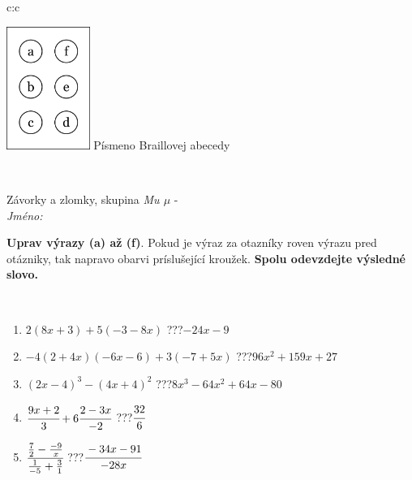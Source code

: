 \documentclass[10pt]{report}
\begin{document}
\begin{tabular}{c:c}
\begin{minipage}[c][104.5mm][t]{0.5\linewidth}
\begin{center}
\begin{minipage}{0.20\linewidth}
\begin{center}
\includegraphics[height=40mm]{../images/braille.png}
{\small Písmeno Braillovej abecedy}
\end{center}
\end{minipage}
\end{center}
\end{minipage}
\\ \hdashline
\begin{minipage}[c][104.5mm][t]{0.5\linewidth}
\begin{center}
\vspace{7mm}
{\huge Závorky a zlomky, skupina \textit{Mu $\mu$} -}\\[5mm]
\textit{Jméno:}\phantom{xxxxxxxxxxxxxxxxxxxxxxxxxxxxxxxxxxxxxxxxxxxxxxxxxxxxxxxxxxxxxxxxx}\\[5mm]
\begin{minipage}{0.95\linewidth}
\begin{center}
\textbf{Uprav výrazy (a) až (f)}. Pokud je výraz za otazníky roven výrazu pred otázniky, tak napravo obarvi príslušející kroužek. \textbf{Spolu odevzdejte výsledné slovo.}
\end{center}
\end{minipage}
\\[1mm]
\begin{minipage}{0.79\linewidth}
\begin{center}
\begin{varwidth}{\linewidth}
\begin{enumerate}
\normalsize
\item $2(8x+3)+5(-3-8x)$\quad \dotfill\; ???\;\dotfill \quad $-24x-9$
\item $-4(2+4x)(-6x-6)+3(-7+5x)$\quad \dotfill\; ???\;\dotfill \quad $96x^2+159x+27$
\item $(2x-4)^3-(4x+4)^2$\quad \dotfill\; ???\;\dotfill \quad $8x^3-64x^2+64x-80$
\item $\cfrac{9x+2}{3}+6\cfrac{2-3x}{-2}$\quad \dotfill\; ???\;\dotfill \quad $\cfrac{32}{6}$
\item $\cfrac{\frac{7}{2}-\frac{-9}{x}}{\frac{1}{-5}+\frac{3}{1}}$\quad \dotfill\; ???\;\dotfill \quad $\cfrac{-34x-91}{-28x}$

\end{enumerate}
\end{varwidth}
\end{center}
\end{minipage}
\end{center}
\end{minipage}
\end{tabular}
\end{document}
